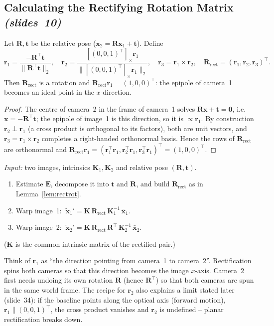 \documentclass[11pt,a4paper]{article}
\newcommand{\slr}[1]{\texorpdfstring{\emph{(slides~#1)}}{(slides #1)}}
\newcommand{\vt}{\bm{t}}
\newcommand{\xb}{\bar{\bm{x}}}
\newcommand{\xt}{\tilde{\bm{x}}}
\newcommand{\E}{\bm{E}}
\newcommand{\R}{\bm{R}}
\newcommand{\K}{\bm{K}}
\newcommand{\Rrect}{\bm{R}_{\mathrm{rect}}}
\newcommand{\norm}[1]{\lVert #1\rVert}
\theoremstyle{definition}
\begin{document}
\subsection{Calculating the Rectifying Rotation Matrix \slr{10}}
\begin{Lemma}\label{lem:rectrot}
Let $\R,\vt$ be the relative pose ($\bm x_2=\R\bm x_1+\vt$). Define
\[
\bm r_1=\frac{-\R^{\top}\vt}{\norm{\R^{\top}\vt}_2},\quad
\bm r_2=\frac{[(0,0,1)^{\top}]_\times\bm r_1}{\norm{[(0,0,1)^{\top}]_\times\bm r_1}_2},\quad
\bm r_3=\bm r_1\times\bm r_2,\quad
\Rrect=(\bm r_1,\bm r_2,\bm r_3)^{\top}.
\]
Then $\Rrect$ is a rotation and $\Rrect\bm r_1=(1,0,0)^{\top}$: the epipole of camera~1 becomes an ideal point in the $x$-direction.
\end{Lemma}
\begin{proof}
The centre of camera~2 in the frame of camera~1 solves $\R\bm x+\vt=\bm 0$, i.e.\ $\bm x=-\R^{\top}\vt$; the epipole of image~1 is this direction, so it is $\propto\bm r_1$. By construction $\bm r_2\perp\bm r_1$ (a cross product is orthogonal to its factors), both are unit vectors, and $\bm r_3=\bm r_1\times\bm r_2$ completes a right-handed orthonormal basis. Hence the rows of $\Rrect$ are orthonormal and $\Rrect\bm r_1=(\bm r_1^{\top}\bm r_1,\bm r_2^{\top}\bm r_1,\bm r_3^{\top}\bm r_1)^{\top}=(1,0,0)^{\top}$.
\end{proof}
\begin{Algorithm}[Rectification]
\emph{Input:} two images, intrinsics $\K_1,\K_2$ and relative pose $(\R,\vt)$.\par
\begin{enumerate}[leftmargin=*]
\item Estimate $\E$, decompose it into $\vt$ and $\R$, and build $\Rrect$ as in Lemma~\ref{lem:rectrot}.
\item Warp image~1: $\ \xt_1'=\K\,\Rrect\,\K_1^{-1}\,\xb_1$.
\item Warp image~2: $\ \xt_2'=\K\,\Rrect\,\R^{\top}\,\K_2^{-1}\,\xb_2$.
\end{enumerate}
($\K$ is the common intrinsic matrix of the rectified pair.)
\end{Algorithm}
\begin{intuition}
Think of $\bm r_1$ as ``the direction pointing from camera~1 to camera~2''. Rectification spins both cameras so that this direction becomes the image $x$-axis. Camera~2 first needs undoing its own rotation $\R$ (hence $\R^{\top}$) so that both cameras are spun in the same world frame. The recipe for $\bm r_2$ also explains a limit stated later (slide~34): if the baseline points along the optical axis (forward motion), $\bm r_1\parallel(0,0,1)^{\top}$, the cross product vanishes and $\bm r_2$ is undefined -- planar rectification breaks down.
\end{intuition}
\end{document}
